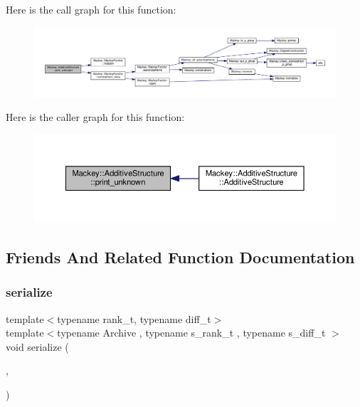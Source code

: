 Here is the call graph for this function\+:\nopagebreak
\begin{figure}[H]
\begin{center}
\leavevmode
\includegraphics[width=350pt]{classMackey_1_1AdditiveStructure_a6c68d66e89c3ad3a81dde8fd35837c3c_cgraph}
\end{center}
\end{figure}
Here is the caller graph for this function\+:\nopagebreak
\begin{figure}[H]
\begin{center}
\leavevmode
\includegraphics[width=350pt]{classMackey_1_1AdditiveStructure_a6c68d66e89c3ad3a81dde8fd35837c3c_icgraph}
\end{center}
\end{figure}


\subsection{Friends And Related Function Documentation}
\mbox{\label{classMackey_1_1AdditiveStructure_ac693381dd6714e55f0307b9cea4a87cf}} 
\subsubsection{\texorpdfstring{serialize}{serialize}}
{\footnotesize\ttfamily template$<$typename rank\+\_\+t, typename diff\+\_\+t$>$ \\
template$<$typename Archive , typename s\+\_\+rank\+\_\+t , typename s\+\_\+diff\+\_\+t $>$ \\
void serialize (\begin{DoxyParamCaption}\item[{Archive \&}]{,  }\item[{\hyperlink{classMackey_1_1AdditiveStructure}{Additive\+Structure}$<$ s\+\_\+rank\+\_\+t, s\+\_\+diff\+\_\+t $>$ \&}]{ }\end{DoxyParamCaption})\hspace{0.3cm}{\ttfamily [friend]}}



